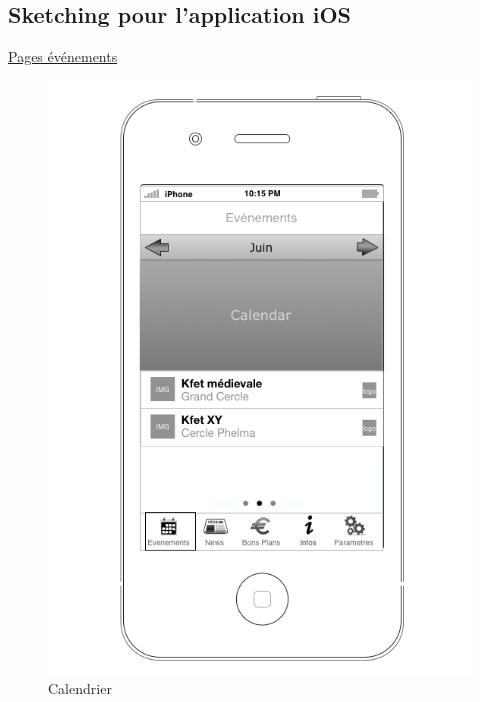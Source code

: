 \documentclass[a4paper, 11pt]{article}
\begin{document}
\subsection{Sketching pour l'application iOS}
\label{sketchiOS}

\underline{Pages événements}
\begin{figure}[htbp]
	\begin{minipage}[c]{.33\linewidth}
		\begin{center}
			\includegraphics[scale=0.28]{../../Sketch/iOS/evenements_calendar.png}
		\end{center}
	\caption{Calendrier}
	\label{calendar}


\end{minipage}
\end{figure}
\end{document}
